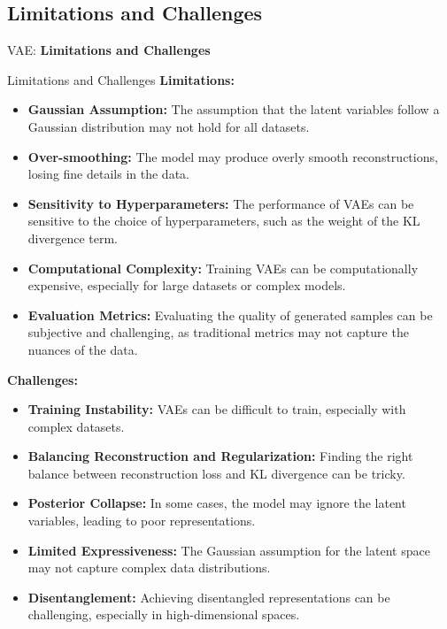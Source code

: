 \subsection{Limitations and Challenges}
\begin{frame}{}
	\LARGE VAE: \textbf{Limitations and Challenges}
\end{frame}

\begin{frame}[allowframebreaks]{Limitations and Challenges}
\textbf{Limitations:}
\begin{itemize}
    \item \textbf{Gaussian Assumption:} The assumption that the latent variables follow a Gaussian distribution may not hold for all datasets.
    \item \textbf{Over-smoothing:} The model may produce overly smooth reconstructions, losing fine details in the data.
    \item \textbf{Sensitivity to Hyperparameters:} The performance of VAEs can be sensitive to the choice of hyperparameters, such as the weight of the KL divergence term.
    \item \textbf{Computational Complexity:} Training VAEs can be computationally expensive, especially for large datasets or complex models.
    \item \textbf{Evaluation Metrics:} Evaluating the quality of generated samples can be subjective and challenging, as traditional metrics may not capture the nuances of the data.
\end{itemize}
\framebreak

\textbf{Challenges:}
\begin{itemize}
    \item \textbf{Training Instability:} VAEs can be difficult to train, especially with complex datasets.
    \item \textbf{Balancing Reconstruction and Regularization:} Finding the right balance between reconstruction loss and KL divergence can be tricky.
    \item \textbf{Posterior Collapse:} In some cases, the model may ignore the latent variables, leading to poor representations.
    \item \textbf{Limited Expressiveness:} The Gaussian assumption for the latent space may not capture complex data distributions.
    \item \textbf{Disentanglement:} Achieving disentangled representations can be challenging, especially in high-dimensional spaces.
\end{itemize}
\framebreak


\end{frame}
